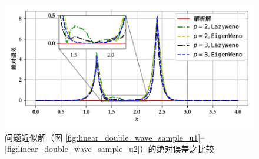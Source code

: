 \begin{figure}[h!]
\begin{centering}
\includegraphics[width=1\textwidth,height=0.3\textheight]{figures/linear_system/error}
\par\end{centering}
\caption{\label{fig:linear_double_wave_error}问题近似解（图
\ref{fig:linear_double_wave_sample_u1}–\ref{fig:linear_double_wave_sample_u2}）的绝对误差之比较}
\end{figure}

